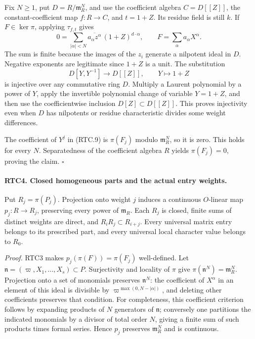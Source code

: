\documentclass[11pt,a4paper]{article}
\numberwithin{equation}{section}
\theoremstyle{remark}\newtheorem{remark}[theorem]{Remark}
\begin{document}
Fix \(N\geq1\), put \(D=R/\mathfrak m_R^N\), and use the
coefficient algebra \(C=D[[Z]]\), the constant-coefficient map
\(f:R\to C\), and \(t=1+Z\).  Its residue field is still
\(k\).  If \(F\in\ker\pi\), applying \(\tau_{f,t}\) gives
\[
 0=\sum_{|\alpha|<N}
       \overline{a_\alpha z^\alpha}\,(1+Z)^{d\cdot\alpha},
       \qquad F=\sum_\alpha a_\alpha X^\alpha.
                                                        \tag{RTC.9}
\]
The sum is finite because the images of the \(z_i\) generate a
nilpotent ideal in \(D\).  Negative exponents are legitimate since
\(1+Z\) is a unit.  The substitution
\[
 D[Y,Y^{-1}]\longrightarrow D[[Z]],\qquad Y\longmapsto1+Z
                                                        \tag{RTC.10}
\]
is injective over any commutative ring \(D\).  Multiply a Laurent
polynomial by a power of \(Y\), apply the invertible polynomial
change of variable \(Y=1+Z\), and then use the coefficientwise
inclusion \(D[Z]\subset D[[Z]]\).  This proves injectivity even
when \(D\) has nilpotents or residue characteristic divides some
weight differences.

The coefficient of \(Y^j\) in (RTC.9) is
\(\pi(F_j)\) modulo \(\mathfrak m_R^N\), so it is zero.
This holds for every \(N\).  Separatedness of the coefficient
algebra \(R\) yields \(\pi(F_j)=0\), proving the claim.
\hfill\(\square\)

\paragraph{RTC4. Closed homogeneous parts and the actual entry weights.}
\label{claim:RTC4}
Put \(R_j=\pi(P_j)\).  Projection onto weight \(j\) induces a
continuous \(O\)-linear map \(p_j:R\to R_j\), preserving every
power of \(\mathfrak m_R\).  Each \(R_j\) is closed, finite
sums of distinct weights are direct, and
\(R_iR_j\subset R_{i+j}\).  Every universal matrix entry belongs
to its prescribed part, and every universal local character value
belongs to \(R_0\).

\emph{Proof.}
RTC3 makes \(p_j(\pi(F))=\pi(F_j)\) well-defined.  Let
\(\mathfrak n=(\varpi,X_1,\ldots,X_s)\subset P\).
Surjectivity and locality of \(\pi\) give
\(\pi(\mathfrak n^N)=\mathfrak m_R^N\).
Projection onto a set of monomials preserves \(\mathfrak n^N\):
the coefficient of \(X^\alpha\) in an element of this ideal is
divisible by
\(\varpi^{\max(0,N-|\alpha|)}\), and deleting other coefficients
preserves that condition.  For completeness, this coefficient
criterion follows by expanding products of \(N\) generators of
\(\mathfrak n\); conversely one partitions the indicated monomials
by a divisor of total order \(N\), giving a finite sum of such
products times formal series.  Hence \(p_j\) preserves
\(\mathfrak m_R^N\) and is continuous.
\end{document}
